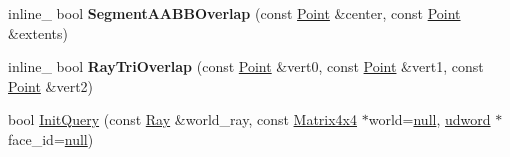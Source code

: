 \begin{DoxyCompactItemize}
\item 
inline\+\_\+ bool {\bfseries Segment\+A\+A\+B\+B\+Overlap} (const \hyperlink{classOpcode_1_1Point}{Point} \&center, const \hyperlink{classOpcode_1_1Point}{Point} \&extents)\hypertarget{classOpcode_1_1RayCollider_a222ad01c5cf5db3c4375c69150cf9d3f}{}\label{classOpcode_1_1RayCollider_a222ad01c5cf5db3c4375c69150cf9d3f}

\item 
inline\+\_\+ bool {\bfseries Ray\+Tri\+Overlap} (const \hyperlink{classOpcode_1_1Point}{Point} \&vert0, const \hyperlink{classOpcode_1_1Point}{Point} \&vert1, const \hyperlink{classOpcode_1_1Point}{Point} \&vert2)\hypertarget{classOpcode_1_1RayCollider_a834e181c28caf748cbf758a742c39fca}{}\label{classOpcode_1_1RayCollider_a834e181c28caf748cbf758a742c39fca}

\item 
bool \hyperlink{classOpcode_1_1RayCollider_a4a4564d6b6243209c278566a768c49ec}{Init\+Query} (const \hyperlink{classOpcode_1_1Ray}{Ray} \&world\+\_\+ray, const \hyperlink{classOpcode_1_1Matrix4x4}{Matrix4x4} $\ast$world=\hyperlink{IceTypes_8h_ac97b8ee753e4405397a42ad5799b0f9e}{null}, \hyperlink{IceTypes_8h_a44c6f1920ba5551225fb534f9d1a1733}{udword} $\ast$face\+\_\+id=\hyperlink{IceTypes_8h_ac97b8ee753e4405397a42ad5799b0f9e}{null})
\end{DoxyCompactItemize}
